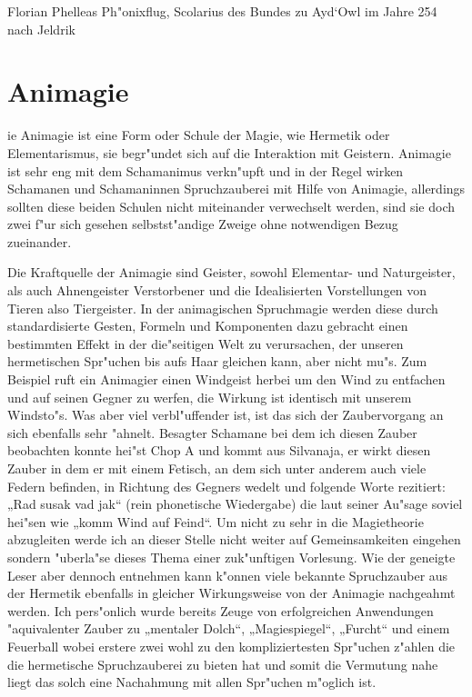 \documentclass[a5paper,8pt]{book}
\begin{document}
\vspace{10mm}

Florian Phelleas Ph"onixflug, Scolarius des Bundes zu Ayd`Owl im Jahre 254 nach Jeldrik

\newpage

\section{ Animagie}

ie Animagie ist eine Form oder Schule der Magie, wie Hermetik oder Elementarismus, sie begr"undet sich auf die Interaktion mit Geistern. Animagie ist sehr eng mit dem Schamanimus verkn"upft und in der Regel wirken Schamanen und Schamaninnen Spruchzauberei mit Hilfe von Animagie, allerdings sollten diese beiden Schulen nicht miteinander verwechselt werden, sind sie doch zwei f"ur sich gesehen selbstst"andige Zweige ohne notwendigen Bezug zueinander.

Die Kraftquelle der Animagie sind Geister, sowohl Elementar- und Naturgeister, als auch Ahnengeister Verstorbener und die Idealisierten Vorstellungen von Tieren also Tiergeister. In der animagischen Spruchmagie werden diese durch standardisierte Gesten, Formeln und Komponenten dazu gebracht einen bestimmten Effekt in der die"seitigen Welt zu verursachen, der unseren hermetischen Spr"uchen bis aufs Haar gleichen kann, aber nicht mu"s. Zum Beispiel ruft ein Animagier einen Windgeist herbei um den Wind zu entfachen und auf seinen Gegner zu werfen, die Wirkung ist identisch mit unserem Windsto"s. Was aber viel verbl"uffender ist, ist das sich der Zaubervorgang an sich ebenfalls sehr "ahnelt. Besagter Schamane bei dem ich diesen Zauber beobachten konnte hei"st Chop A und kommt aus Silvanaja, er wirkt diesen Zauber in dem er mit einem Fetisch, an dem sich unter anderem auch viele Federn befinden, in Richtung des Gegners wedelt und folgende Worte rezitiert: „Rad susak vad jak“ (rein phonetische Wiedergabe) die laut 
seiner Au"sage soviel hei"sen wie „komm Wind auf Feind“. Um nicht zu sehr in die Magietheorie abzugleiten werde ich an dieser Stelle nicht weiter auf Gemeinsamkeiten eingehen sondern "uberla"se dieses Thema einer zuk"unftigen Vorlesung. Wie der geneigte Leser aber dennoch entnehmen kann k"onnen viele bekannte Spruchzauber aus der Hermetik ebenfalls in gleicher Wirkungsweise von der Animagie nachgeahmt werden. Ich pers"onlich wurde bereits Zeuge von erfolgreichen Anwendungen "aquivalenter Zauber zu „mentaler Dolch“, „Magiespiegel“, „Furcht“ und einem Feuerball wobei erstere zwei wohl zu den kompliziertesten Spr"uchen z"ahlen die die hermetische Spruchzauberei zu bieten hat und somit die Vermutung nahe liegt das solch eine Nachahmung mit allen Spr"uchen m"oglich ist.
\end{document}

